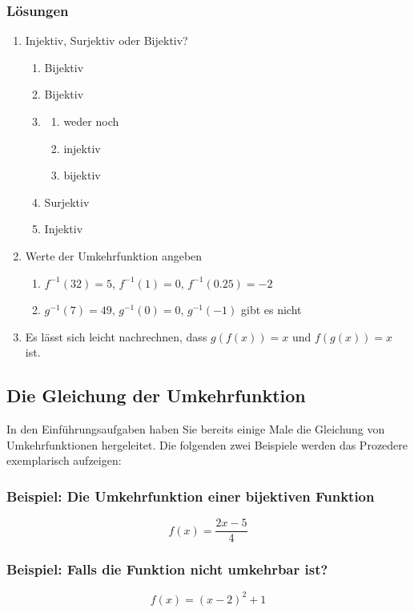 \subsubsection{Lösungen}
\begin{enumerate}
    \item Injektiv, Surjektiv oder Bijektiv?
          \begin{enumerate}
              \item Bijektiv
              \item Bijektiv
              \item \begin{enumerate}[label=\roman*.]
                        \item weder noch
                        \item injektiv
                        \item bijektiv
                    \end{enumerate}
              \item Surjektiv
              \item Injektiv
          \end{enumerate}

    \item Werte der Umkehrfunktion angeben
          \begin{enumerate}
              \item $f^{-1}(32)=5$, \quad $f^{-1}(1)=0$, \quad $f^{-1}(0.25)=-2$
              \item $g^{-1}(7)=49$, \quad $g^{-1}(0)=0$, \quad $g^{-1}(-1)$ gibt es nicht
          \end{enumerate}

    \item Es lässt sich leicht nachrechnen, dass $g(f(x))=x$ und $f(g(x))=x$ ist.
\end{enumerate}
\newpage
\subsection{Die Gleichung der Umkehrfunktion}
In den Einführungsaufgaben haben Sie bereits einige Male die Gleichung von Umkehrfunktionen hergeleitet. Die folgenden zwei Beispiele werden das Prozedere exemplarisch aufzeigen:
\subsubsection*{Beispiel: Die Umkehrfunktion einer bijektiven Funktion}
\[f(x) = \frac{2x-5}{4}\]
\subsubsection*{Beispiel: Falls die Funktion nicht umkehrbar ist?}
\[f(x) = (x-2)^2+1\]
\newpage
